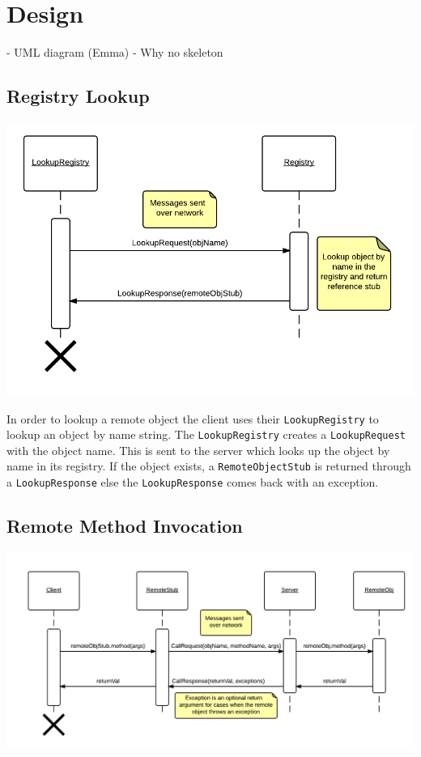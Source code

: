 \documentclass[12pt]{article}
\begin{document}
\maketitle


\section{Design}

- UML diagram (Emma)
- Why no skeleton

\subsection*{Registry Lookup}

\includegraphics[scale=.4]{Lookup.png}

In order to lookup a remote object the client uses their \texttt{LookupRegistry} to lookup an object by name string. The \texttt{LookupRegistry} creates a \texttt{LookupRequest} with the object name. This is sent to the server which looks up the object by name in its registry. If the object exists, a \texttt{RemoteObjectStub} is returned through a \texttt{LookupResponse} else the \texttt{LookupResponse} comes back with an exception.

\subsection*{Remote Method Invocation}

\includegraphics[scale=.3]{callMethod.png}
\end{document}
